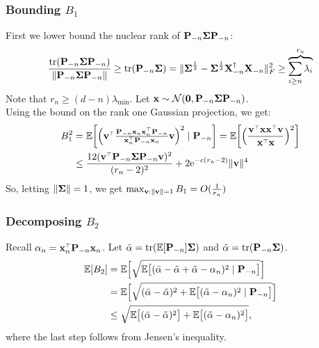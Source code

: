 \documentclass[10pt]{beamer}
\begin{document}
\begin{frame}
  \frametitle{Bounding $B_1$}
  First we lower bound the nuclear rank of $\mathbf P_{-n}\mathbf{\Sigma}\mathbf P_{-n}$:
  \begin{align*}
    \frac{\mathrm{tr}(\mathbf P_{-n}\mathbf{\Sigma}\mathbf P_{-n})} {\|\mathbf P_{-n}\mathbf{\Sigma}\mathbf P_{-n}\|}\geq
    \mathrm{tr}(\mathbf P_{-n}\mathbf{\Sigma}) =
    \|\mathbf{\Sigma}^{\frac12}-\mathbf{\Sigma}^{\frac12}\mathbf X_{-n}^\dagger\mathbf X_{-n}\|_F^2\geq
    \overbrace{\sum_{i\geq n}\lambda_i}^{r_n}
  \end{align*}
Note that $r_n\geq (d-n)\lambda_{\min}$.  Let $\mathbf x \sim\mathcal{N}(\mathbf 0, \mathbf P_{-n}\mathbf{\Sigma}\mathbf P_{-n})$.\\
  Using the bound on  the rank one Gaussian projection, we get:
  \begin{align*}
B_1^2&=\E\bigg[\Big(\v^\top\tfrac{\P_{-n}\x_n\x_n^\top\P_{-n}}{\x_n^\top\P_{-n}\x_n}\v\Big)^2\mid
    \P_{-n}\bigg]
    =\E\bigg[\Big(\frac{\v^\top\x\x^\top\v}{\x^\top\x}\Big)^2\bigg] \\
     &\leq
      \frac{12(\v^\top\P_{-n}\Sigmab\P_{-n}\v)^2} {(r_n-2)^2} + 2\ee^{-c(r_n-2)}\|\v\|^4
  \end{align*}
  So, letting $\|\mathbf{\Sigma}\|=1$, we get $\max_{\mathbf v:\|\mathbf v\|=1}B_1= O(\frac1{r_n})$
\end{frame}

\begin{frame}
  \frametitle{Decomposing $B_2$}
Recall $\alpha_n = \x_n^\top\P_{-n}\x_n$. Let
$\bar\alpha=\mathrm{tr}(\mathbb E[\mathbf P_{-n}]\mathbf{\Sigma})$ and
$\tilde\alpha=\mathrm{tr}(\mathbf P_{-n}\mathbf{\Sigma})$.
\begin{align*}
\mathbb E[B_2]&=\mathbb E\Big[\sqrt{\mathbb E\big[(\bar\alpha-\tilde\alpha+\tilde\alpha-\alpha_n)^2
         \mid\mathbf P_{-n}\big]}\Big]\\
&=\mathbb E\Big[\sqrt{(\bar\alpha-\tilde\alpha)^2 +
                                    \mathbb E\big[(\tilde\alpha-\alpha_n)^2\mid\mathbf P_{-n}\big]}\Big]\\
&\leq \sqrt{\mathbb E\big[(\bar\alpha-\tilde\alpha)^2\big]
+ \mathbb E\big[(\tilde\alpha-\alpha_n)^2\big] },
\end{align*}
where the last step follows from Jensen's inequality.
\end{frame}
\end{document}
